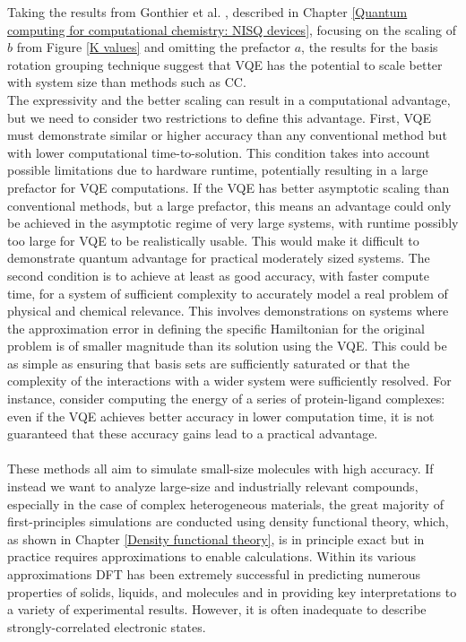 Taking the results from Gonthier et al. \cite{Gonthier2020Dec}, described in Chapter \ref{Quantum computing for computational chemistry: NISQ devices}, focusing on the scaling of $b$ from Figure \ref{K values} and omitting the prefactor $a$, the results for the basis rotation grouping technique suggest that VQE has the potential to scale better with system size than methods such as CC. \\
The expressivity and the better scaling can result in a computational advantage, but we need to consider two restrictions to define this advantage. First, VQE must demonstrate similar or higher accuracy than any conventional method but with lower computational time-to-solution. This condition takes into account possible limitations due to hardware runtime, potentially resulting in a large prefactor for VQE computations. If the VQE has better asymptotic scaling than conventional methods, but a large prefactor, this means an advantage could only be achieved in the asymptotic regime of very large systems, with runtime possibly too large for VQE to be realistically usable. This would make it difficult to demonstrate quantum advantage for practical moderately sized systems. The second condition is to achieve at least as good accuracy, with faster compute time, for a system of sufficient complexity to accurately model a real problem of physical and chemical relevance. This involves demonstrations on systems where the approximation error in defining the specific Hamiltonian for the original problem is of smaller magnitude than its solution using the VQE. This could be as simple as ensuring that basis sets are sufficiently saturated or that the complexity of the interactions with a wider system were sufficiently resolved. For instance, consider computing the energy of a series of protein-ligand complexes: even if the VQE achieves better accuracy in lower computation time, it is not guaranteed that these accuracy gains lead to a practical advantage. \\
\\
These methods all aim to simulate small-size molecules with high accuracy. If instead we want to analyze large-size and industrially relevant compounds, especially in the case of complex heterogeneous materials, the great majority of first-principles simulations are conducted using density functional theory, which, as shown in Chapter \ref{Density functional theory}, is in principle exact but in practice requires approximations to enable calculations. Within its various approximations DFT has been extremely successful in predicting numerous properties of solids, liquids, and molecules and in providing key interpretations to a variety of experimental results. However, it is often inadequate to describe strongly-correlated electronic states. \\
